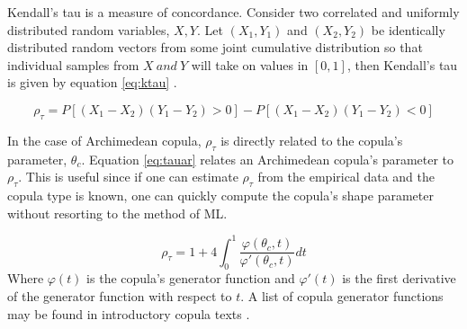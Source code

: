 Kendall's tau is a measure of concordance.  Consider two correlated and uniformly distributed random variables, $X, Y$.
Let $(X_1, Y_1)$ and $(X_2, Y_2)$ be identically distributed random vectors from some joint cumulative distribution so that individual samples from $X\ and\ Y$ will take on values in $[0,1]$, then Kendall's tau is given by equation \ref{eq:ktau} \cite{Nelsen2006}.  

\begin{equation}
\rho_\tau = P[(X_1 - X_2)(Y_1-Y_2)>0] - P[(X_1 - X_2)(Y_1 - Y_2)<0]
\label{eq:ktau}
\end{equation}

In the case of Archimedean copula, $\rho_\tau$ is directly related to the copula's parameter, $\theta_c$.
Equation \ref{eq:tauar} relates an Archimedean copula's parameter to $\rho_\tau$.  This is useful since if one can estimate $\rho_\tau$ from the empirical data and the copula type is known, one can quickly compute the copula's shape parameter without resorting to the method of ML.

\begin{equation}
\rho_\tau = 1 + 4 \int_0^1 \frac{\varphi(\theta_c,t)}{\varphi'(\theta_c, t)}dt
\label{eq:tauar}
\end{equation}
Where $\varphi(t)$ is the copula's generator function and $\varphi'(t)$ is the first derivative of the generator function with respect to $t$. A list of copula generator functions may be found in introductory copula texts \cite{Nelsen2006}.





